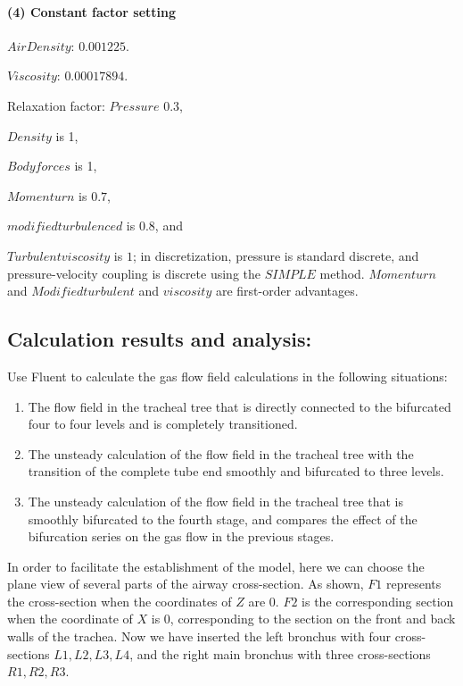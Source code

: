 \documentclass[
]{article}
\begin{document}
\hypertarget{4-constant-factor-setting}{%
\paragraph{\texorpdfstring{(4) Constant factor setting
}{(4) Constant factor setting }}\label{4-constant-factor-setting}}

\(Air Density\): \(0.001225\).

\(Viscosity\): \(0.00017894\).

Relaxation factor: \(Pressure\) 0.3,

\(Density\) is 1,

\(Body forces\) is 1,

\(Momenturn\) is \(0.7\),

\(modified turbulenced\) is \(0.8\), and

\(Turbulent viscosity\) is \(1\); in discretization, pressure is
standard discrete, and pressure-velocity coupling is discrete using the
\(SIMPLE\) method. \(Momenturn\) and \(Modified turbulent\) and
\(viscosity\) are first-order advantages.

\hypertarget{calculation-results-and-analysis}{%
\subsection{\texorpdfstring{Calculation results and analysis:
}{Calculation results and analysis: }}\label{calculation-results-and-analysis}}

Use Fluent to calculate the gas flow field calculations in the following
situations:

\begin{enumerate}
\def\labelenumi{\arabic{enumi}.}
\item
  The flow field in the tracheal tree that is directly connected to the
  bifurcated four to four levels and is completely transitioned.
\item
  The unsteady calculation of the flow field in the tracheal tree with
  the transition of the complete tube end smoothly and bifurcated to
  three levels.
\item
  The unsteady calculation of the flow field in the tracheal tree that
  is smoothly bifurcated to the fourth stage, and compares the effect of
  the bifurcation series on the gas flow in the previous stages.
\end{enumerate}

In order to facilitate the establishment of the model, here we can
choose the plane view of several parts of the airway cross-section. As
shown, \(F1\) represents the cross-section when the coordinates of \(Z\)
are \(0\). \(F2\) is the corresponding section when the coordinate of
\(X\) is \(0\), corresponding to the section on the front and back walls
of the trachea. Now we have inserted the left bronchus with four
cross-sections \(L1, L2, L3, L4\), and the right main bronchus with
three cross-sections \(R1, R2, R3\).
\end{document}
